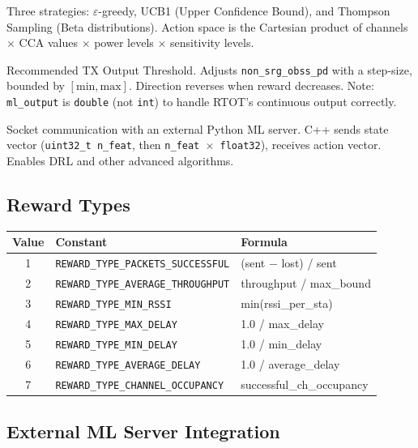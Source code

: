 \documentclass[11pt,a4paper]{article}
\begin{document}
\begin{description}[style=nextline]
  \item[Multi-Armed Bandits (\texttt{multi\_armed\_bandits.h})]
  Three strategies: $\varepsilon$-greedy, UCB1 (Upper Confidence Bound), and Thompson Sampling (Beta distributions).  Action space is the Cartesian product of channels $\times$ CCA values $\times$ power levels $\times$ sensitivity levels.

  \item[RTOT (\texttt{rtot\_algorithm.h})]
  Recommended TX Output Threshold.  Adjusts \texttt{non\_srg\_obss\_pd} with a step-size, bounded by $[\text{min}, \text{max}]$.  Direction reverses when reward decreases.  Note: \texttt{ml\_output} is \texttt{double} (not \texttt{int}) to handle RTOT's continuous output correctly.

  \item[External Model (\texttt{external\_model\_client.h})]
  Socket communication with an external Python ML server.  C++ sends state vector (\texttt{uint32\_t n\_feat}, then \texttt{n\_feat $\times$ float32}), receives action vector.  Enables DRL and other advanced algorithms.
\end{description}

\subsection{Reward Types}

\begin{longtable}{c l l}
\toprule
\textbf{Value} & \textbf{Constant} & \textbf{Formula} \\
\midrule
1 & \texttt{REWARD\_TYPE\_PACKETS\_SUCCESSFUL} & (sent $-$ lost) / sent \\
2 & \texttt{REWARD\_TYPE\_AVERAGE\_THROUGHPUT} & throughput / max\_bound \\
3 & \texttt{REWARD\_TYPE\_MIN\_RSSI} & min(rssi\_per\_sta) \\
4 & \texttt{REWARD\_TYPE\_MAX\_DELAY} & 1.0 / max\_delay \\
5 & \texttt{REWARD\_TYPE\_MIN\_DELAY} & 1.0 / min\_delay \\
6 & \texttt{REWARD\_TYPE\_AVERAGE\_DELAY} & 1.0 / average\_delay \\
7 & \texttt{REWARD\_TYPE\_CHANNEL\_OCCUPANCY} & successful\_ch\_occupancy \\
\bottomrule
\end{longtable}

\subsection{External ML Server Integration}
\end{document}
